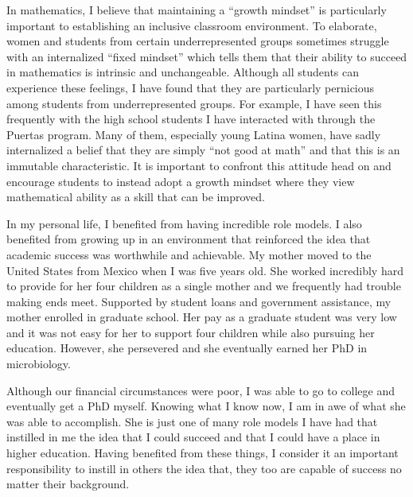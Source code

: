 \documentclass{article}
\begin{document}
In mathematics, I believe that maintaining a ``growth mindset'' is particularly important to establishing an inclusive classroom environment. To elaborate, women and students from certain underrepresented groups sometimes struggle with an internalized ``fixed mindset'' which tells them that their ability to succeed in mathematics is intrinsic and unchangeable. Although all students can experience these feelings, I have found that they are particularly pernicious among students from underrepresented groups. For example, I have seen this frequently with the high school students I have interacted with through the Puertas program. Many of them, especially young Latina women, have sadly internalized a belief that they are simply ``not good at math'' and that this is an immutable characteristic. It is important to confront this attitude head on and encourage students to instead adopt a growth mindset where they view mathematical ability as a skill that can be improved.

In my personal life, I benefited from having incredible role models. I also benefited from growing up in an environment that reinforced the idea that academic success was worthwhile and achievable. My mother moved to the United States from Mexico when I was five years old. She worked incredibly hard to provide for her four children as a single mother and we frequently had trouble making ends meet. Supported by student loans and government assistance, my mother enrolled in graduate school. Her pay as a graduate student was very low and it was not easy for her to support four children while also pursuing her education. However, she persevered and she eventually earned her PhD in microbiology.

Although our financial circumstances were poor, I was able to go to college and eventually get a PhD myself. Knowing what I know now, I am in awe of what she was able to accomplish. She is just one of many role models I have had that instilled in me the idea that I could succeed and that I could have a place in higher education. Having benefited from these things, I consider it an important responsibility to instill in others the idea that, they too are capable of success no matter their background.
\end{document}
